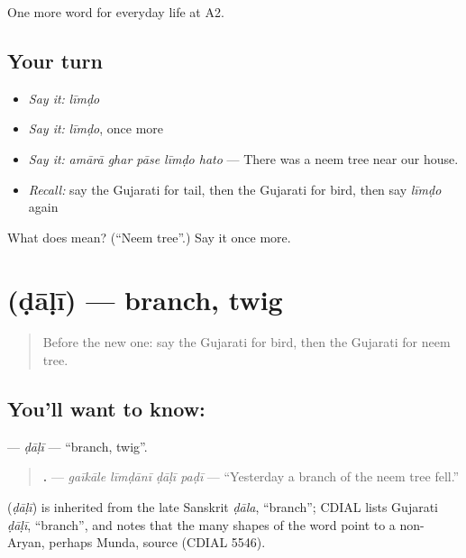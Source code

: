 \begin{grammarlens}[title={What you've built}]
One more word for everyday life at A2.
\end{grammarlens}

\subsection*{Your turn}
\begin{itemize}
\raggedright
  \item \emph{Say it:} \emph{līmḍo}
  \item \emph{Say it:} \emph{līmḍo}, once more
  \item \emph{Say it:} \emph{amārā ghar pāse līmḍo hato} — There was a neem tree near our house.
  \item \emph{Recall:} say the Gujarati for tail, then the Gujarati for bird, then say \emph{līmḍo} again
\end{itemize}

\begin{tcolorbox}[breakable,colback=teal!4,colframe=teal!35!black,title={Before you move on}]
What does  mean? (\textquotedblleft{}Neem tree\textquotedblright{}.) Say it once more.
\end{tcolorbox}
\section[\texorpdfstring{\gu{ડાળી} (ḍāḷī)}{ડાળી (ḍāḷī)}]{ (ḍāḷī) — branch, twig}

\label{lesson:GU-C236-dali}



\begin{quote}
Before the new one: say the Gujarati for bird, then the Gujarati for neem tree.
\end{quote}

\subsection*{You'll want to know: }
\textbf{} — \emph{ḍāḷī} — \textquotedblleft{}branch, twig\textquotedblright{}.

\begin{quote}
\textbf{   .} — \emph{gaīkāle līmḍānī ḍāḷī paḍī} — \textquotedblleft{}Yesterday a branch of the neem tree fell.\textquotedblright{}
\end{quote}

\begin{cousinweb}
\textbf{} (\emph{ḍāḷī}) is inherited from the late Sanskrit \emph{ḍāla}, \textquotedblleft{}branch\textquotedblright{}; CDIAL lists Gujarati \emph{ḍāḷī}, \textquotedblleft{}branch\textquotedblright{}, and notes that the many shapes of the word point to a non-Aryan, perhaps Munda, source (CDIAL 5546).
\end{cousinweb}

